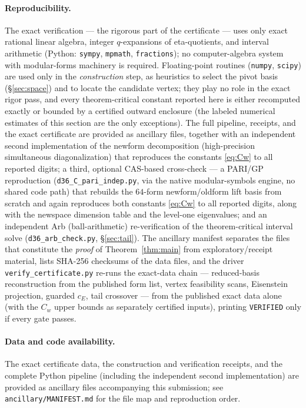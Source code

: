 \documentclass[11pt]{article}
\theoremstyle{remark}
\begin{document}
\paragraph{Reproducibility.} The exact verification --- the rigorous part
of the certificate --- uses only exact rational linear algebra, integer
$q$-expansions of eta-quotients, and interval arithmetic (Python:
\texttt{sympy}, \texttt{mpmath}, \texttt{fractions}); no computer-algebra
system with modular-forms machinery is required. Floating-point routines
(\texttt{numpy}, \texttt{scipy}) are used only in the \emph{construction}
step, as heuristics to select the pivot basis (\S\ref{sec:space}) and
to locate the candidate vertex; they play
no role in the exact rigor pass, and every theorem-critical constant
reported here is either recomputed exactly or bounded by a certified
outward enclosure (the labeled numerical estimates of this section are
the only exceptions). The full pipeline, receipts, and the exact
certificate are provided as ancillary files, together with an
independent second implementation of the newform decomposition
(high-precision simultaneous diagonalization) that reproduces the
constants \eqref{eq:Cw} to all reported digits; a third, optional
CAS-based cross-check --- a PARI/GP reproduction
(\texttt{d36\_C\_pari\_indep.py}, via the native modular-symbols
engine, no shared code path) that rebuilds the $64$-form
newform/oldform lift basis from scratch and again reproduces both
constants \eqref{eq:Cw} to all reported digits, along with the
newspace dimension table and the level-one eigenvalues; and an
independent Arb (ball-arithmetic) re-verification of the
theorem-critical interval solve (\texttt{d36\_arb\_check.py},
\S\ref{sec:tail}). The ancillary manifest
separates the files that constitute the \emph{proof} of
Theorem~\ref{thm:main} from exploratory/receipt material, lists SHA-256
checksums of the data files, and the driver
\texttt{verify\_certificate.py} re-runs the exact-data chain ---
reduced-basis reconstruction from the published form list, vertex
feasibility scans, Eisenstein projection, guarded $c_E$, tail
crossover --- from the published exact data alone (with the $C_w$
upper bounds as separately certified inputs), printing
\texttt{VERIFIED} only if every gate passes.

\paragraph{Data and code availability.} The exact certificate data, the
construction and verification receipts, and the complete Python pipeline
(including the independent second implementation) are provided as
ancillary files accompanying this submission; see
\texttt{ancillary/MANIFEST.md} for the file map and reproduction order.
\end{document}
